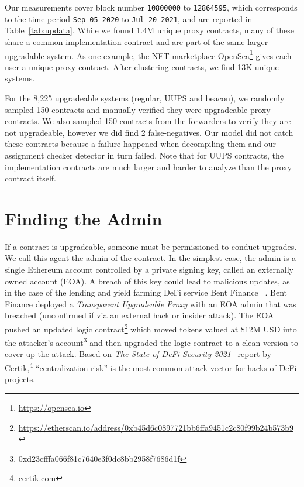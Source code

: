  Our measurements cover block number \texttt{10800000} to \texttt{12864595}, which corresponds to the time-period \texttt{Sep-05-2020} to \texttt{Jul-20-2021}, and are reported in Table~\ref{tab:updata}. While we found 1.4M unique proxy contracts, many of these share a common implementation contract and are part of the same larger upgradable system. As one example, the NFT marketplace OpenSea\footnote{\url{https://opensea.io}} gives each user a unique proxy contract. After clustering contracts, we find 13K unique systems.  
 
 For the 8,225 upgradeable systems (regular, UUPS and beacon), we randomly sampled 150 contracts and manually verified they were upgradeable proxy contracts. We also sampled 150 contracts from the forwarders to verify they are not upgradeable, however we did find 2 false-negatives. Our model did not catch these contracts because a failure happened when decompiling them and our assignment checker detector in turn failed. Note that for UUPS contracts, the implementation contracts are much larger and harder to analyze than the proxy contract itself.



 \section{Finding the Admin}
\label{sec:governance}

If a contract is upgradeable, someone must be permissioned to conduct upgrades. We call this agent the admin of the contract. In the simplest case, the admin is a single Ethereum account controlled by a private signing key, called an externally owned account (EOA). A breach of this key could lead to malicious updates, as in the case of the lending and yield farming DeFi service Bent Finance ~\cite{bentFinanceHack}. Bent Finance deployed a \textit{Transparent Upgradeable Proxy} with an EOA admin that was breached (unconfirmed if via an external hack or insider attack). The EOA pushed an updated logic contract\footnote{\url{https://etherscan.io/address/0xb45d6c0897721bb6ffa9451c2c80f99b24b573b9}}  which moved tokens valued at \$12M USD into the attacker's account\footnote{0xd23cfffa066f81c7640e3f0dc8bb2958f7686d1f} and then upgraded the logic contract to a clean version to cover-up the attack. Based on \textit{The State of DeFi Security 2021}~\cite{certikReport} report by Certik,\footnote{\url{certik.com}} ``centralization risk'' is the most common attack vector for hacks of DeFi projects. 
 
